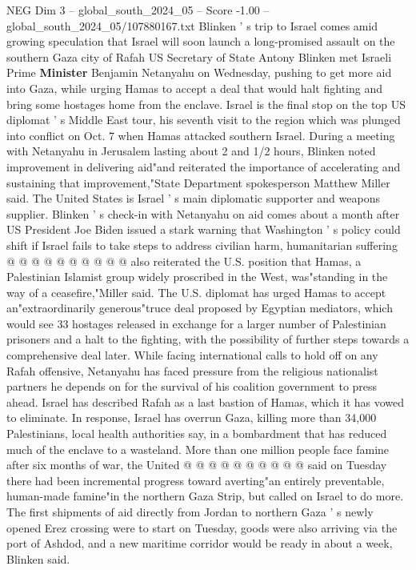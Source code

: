 \begin{textsample}{NEG Dim 3 – global\_south\_2024\_05 – Score -1.00 – global\_south\_2024\_05/107880167.txt}  \label{ex:f3_neg_359}
Blinken ' s trip to Israel comes amid growing speculation that Israel will soon launch a long-promised assault on the southern Gaza city of Rafah US Secretary of State Antony Blinken met Israeli Prime \textbf{Minister} Benjamin Netanyahu on Wednesday, pushing to get more aid into Gaza, while urging Hamas to accept a deal that would halt fighting and bring some hostages home from the enclave.
Israel is the final stop on the top US diplomat ' s Middle East tour, his seventh visit to the region which was plunged into conflict on Oct. 7 when Hamas attacked southern Israel.
During a meeting with Netanyahu in Jerusalem lasting about 2 and 1/2 hours, Blinken noted improvement in delivering aid"and reiterated the importance of accelerating and sustaining that improvement,"State Department spokesperson Matthew Miller said.
The United States is Israel ' s main diplomatic supporter and weapons supplier.
Blinken ' s check-in with Netanyahu on aid comes about a month after US President Joe Biden issued a stark warning that Washington ' s policy could shift if Israel fails to take steps to address civilian harm, humanitarian suffering @ @ @ @ @ @ @ @ @ @ also reiterated the U.S. position that Hamas, a Palestinian Islamist group widely proscribed in the West, was"standing in the way of a ceasefire,"Miller said.
The U.S. diplomat has urged Hamas to accept an"extraordinarily generous"truce deal proposed by Egyptian mediators, which would see 33 hostages released in exchange for a larger number of Palestinian prisoners and a halt to the fighting, with the possibility of further steps towards a comprehensive deal later.
While facing international calls to hold off on any Rafah offensive, Netanyahu has faced pressure from the religious nationalist partners he depends on for the survival of his coalition government to press ahead.
Israel has described Rafah as a last bastion of Hamas, which it has vowed to eliminate.
In response, Israel has overrun Gaza, killing more than 34,000 Palestinians, local health authorities say, in a bombardment that has reduced much of the enclave to a wasteland.
More than one million people face famine after six months of war, the United @ @ @ @ @ @ @ @ @ @ said on Tuesday there had been incremental progress toward averting"an entirely preventable, human-made famine"in the northern Gaza Strip, but called on Israel to do more.
The first shipments of aid directly from Jordan to northern Gaza ' s newly opened Erez crossing were to start on Tuesday, goods were also arriving via the port of Ashdod, and a new maritime corridor would be ready in about a week, Blinken said.

\end{textsample}
